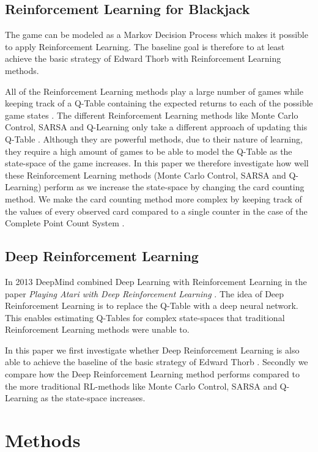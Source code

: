 \documentclass[conference]{IEEEtran}
\begin{document}
\subsection{Reinforcement Learning for Blackjack}
The game can be modeled as a Markov Decision Process which makes it possible to apply Reinforcement Learning.
The baseline goal is therefore to at least achieve the basic strategy of Edward Thorb \cite{b1} with Reinforcement Learning methods.

All of the Reinforcement Learning methods play a large number of games while keeping track of a Q-Table containing the expected returns to each of the possible game states \cite{b4}.
The different Reinforcement Learning methods like Monte Carlo Control, SARSA and Q-Learning only take a different approach of updating this Q-Table \cite{b4}.
Although they are powerful methods, due to their nature of learning, they require a high amount of games to be able to model the Q-Table as the state-space of the game increases. 
In this paper we therefore investigate how well these Reinforcement Learning methods (Monte Carlo Control, SARSA and Q-Learning) perform as we increase the state-space by changing the card counting method. 
We make the card counting method more complex by keeping track of the values of every observed card compared to a single counter in the case of the Complete Point Count System \cite{b1}.

\subsection{Deep Reinforcement Learning}
In 2013 DeepMind combined Deep Learning with Reinforcement Learning in the paper \textit{Playing Atari with Deep Reinforcement Learning} \cite{b2}.
The idea of Deep Reinforcement Learning is to replace the Q-Table with a deep neural network.
This enables estimating Q-Tables for complex state-spaces that traditional Reinforcement Learning methods were unable to.

In this paper we first investigate whether Deep Reinforcement Learning is also able to achieve the baseline of the basic strategy of Edward Thorb \cite{b1}.
Secondly we compare how the Deep Reinforcement Learning method performs compared to the more traditional RL-methods like Monte Carlo Control, SARSA and Q-Learning \cite{b4} as the state-space increases.



\section{Methods}
\end{document}
